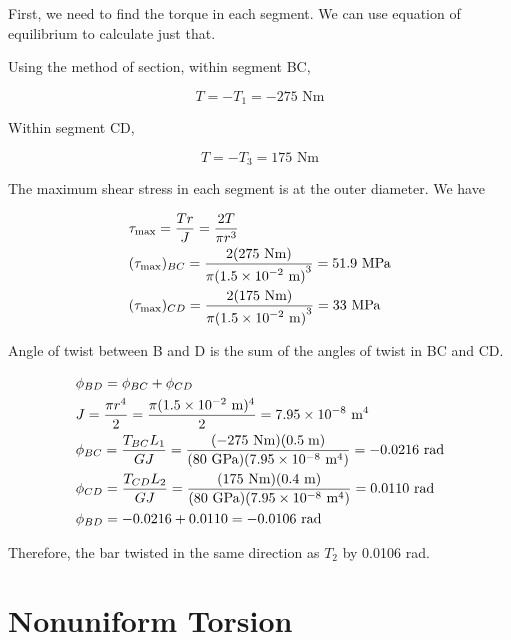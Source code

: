 \documentclass[
10pt,
a4paper,
openany,
svgnames,
]{book} %
\begin{document}
\begin{solution}
First, we need to find the torque in each segment. We can use equation of equilibrium to calculate just that.

Using the method of section, within segment BC,

$$T =  - {T_1} =  - 275\text{ Nm}$$

Within segment CD,

\[T =  - {T_3} = 175\text{ Nm}\]

The maximum shear stress in each segment is at the outer diameter. We have

\[\begin{gathered}
  {\tau _{\max }} = \frac{{Tr}}{{{J}}} = \frac{{2T}}{{\pi {r^3}}} \hfill \\
  {({\tau_{\max }})_{BC}} = \frac{{2(275\text{ Nm})}}{{\pi {{(1.5 \times {{10}^{ - 2}}\text{ m})}^3}}} = 51.9\text{ MPa} \hfill \\
  {({\tau _{\max }})_{CD}} = \frac{{2(175\text{ Nm})}}{{\pi {{(1.5 \times {{10}^{ - 2}}\text{ m})}^3}}} = 33\text{ MPa} \hfill \\ 
\end{gathered} \]

Angle of twist between B and D is the sum of the angles of twist in BC and CD.

\[\begin{gathered}
  \phi_{BD} = \phi_{BC} + \phi_{CD} \hfill \\
  J = \frac{\pi r^4}{2} = \frac{\pi (1.5 \times 10^{-2}\text{ m})^4}{2} = 7.95 \times 10^{-8}\text{ m}^4 \hfill \\
  \phi_{BC} = \frac{T_{BC}L_1}{GJ} = \frac{( - 275\text{ Nm})(0.5\;{\text{m}})}{(80\text{ GPa})(7.95 \times 10^{-8}\text{ m}^4)} =  - 0.0216\text{ rad} \hfill \\
  \phi_{CD} = \frac{T_{CD}L_2}{GJ} = \frac{(175\text{ Nm})(0.4\text{ m})}{(80\text{ GPa})(7.95 \times 10^{-8}\text{ m}^4)} = 0.0110\text{ rad} \hfill \\
  \phi_{BD} =  - 0.0216 + 0.0110 =  - 0.0106\text{ rad} \hfill \\ 
\end{gathered} \]

Therefore, the bar twisted in the same direction as $T_2$ by 0.0106 rad.
\end{solution}

\section{Nonuniform Torsion}
\end{document}
